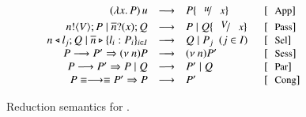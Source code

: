 \begin{figure}[t!]
\[
%
%
%
%
%
		\begin{array}{rcll}
		(\abs{x}{P}) \, u  & \red & P \subst{u}{x} 
& \orule{App}
		\\[1mm]
			\bout{n}{V} P \Par \binp{\dual{n}}{x} Q & \red & P \Par Q \subst{V}{x} & \orule{Pass}
			\\
			\bsel{n}{l_j} Q \Par \bbra{\dual{n}}{l_i : P_i}_{i \in I} & \red & Q \Par P_j ~~(j \in I)~~  & \orule{Sel}
			\\
			P \red P' \Rightarrow \news{n} P & \red & \news{n} P'  & \orule{Sess}
			\\

			P \red P' \Rightarrow   P \Par Q & \red &  P' \Par Q  & \orule{Par}
			\\
			P \scong \red \scong P' \Rightarrow P & \red & P' & \orule{Cong}\\
		\end{array}
\]
	\caption{Reduction semantics for \HOp. \label{fig:reduction}}
\end{figure}
